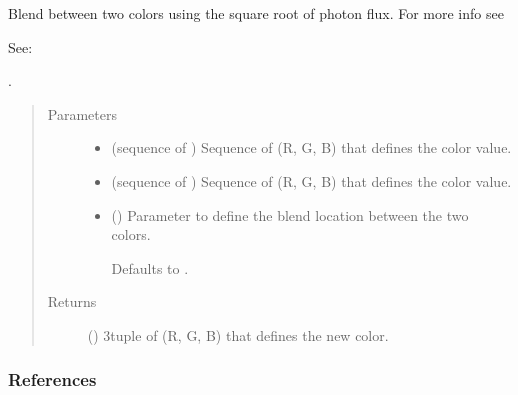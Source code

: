 \documentclass[letterpaper,10pt,english]{sphinxmanual}
\begin{document}
\begin{fulllineitems}
\label{\detokenize{cockatoo:cockatoo.utilities.blend_colors}}
Blend between two colors using the square root of photon flux. For more
info see  %
\begin{footnote}[18]\sphinxAtStartFootnote
{}

See: 
%
\end{footnote}.
\begin{quote}\begin{description}
\item[{Parameters}] \leavevmode\begin{itemize}
\item {} 
 (sequence of ) \textendash{} Sequence of (R, G, B) that defines the color value.

\item {} 
 (sequence of ) \textendash{} Sequence of (R, G, B) that defines the color value.

\item {} 
 (\sphinxstyleliteralemphasis{\sphinxupquote{, }}) \textendash{} 
Parameter to define the blend location between the two colors.

Defaults to .


\end{itemize}

\item[{Returns}] \leavevmode
{} () \textendash{} 3\sphinxhyphen{}tuple of (R, G, B) that defines the new color.

\end{description}\end{quote}
\subsubsection*{References}

\end{fulllineitems}
\end{document}

